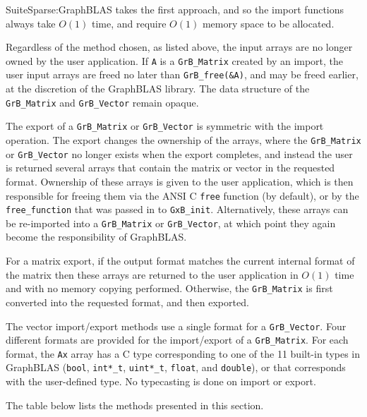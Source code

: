 \documentclass[12pt]{article}
\begin{document}
SuiteSparse:GraphBLAS takes the first approach, and so the import functions
always take $O(1)$ time, and require $O(1)$ memory space to be allocated.

Regardless of the method chosen, as listed above, the input arrays are no
longer owned by the user application.  If \verb'A' is a \verb'GrB_Matrix'
created by an import, the user input arrays are freed no later than
\verb'GrB_free(&A)', and may be freed earlier, at the discretion of the
GraphBLAS library.  The data structure of the \verb'GrB_Matrix' and
\verb'GrB_Vector' remain opaque.

The export of a \verb'GrB_Matrix' or \verb'GrB_Vector' is symmetric with the
import operation.  The export changes the ownership of the arrays, where the
\verb'GrB_Matrix' or \verb'GrB_Vector' no longer exists when the export
completes, and instead the user is returned several arrays that contain the
matrix or vector in the requested format.  Ownership of these arrays is given
to the user application, which is then responsible for freeing them via the
ANSI C \verb'free' function (by default), or by the \verb'free_function' that
was passed in to \verb'GxB_init'.  Alternatively, these arrays can be
re-imported into a \verb'GrB_Matrix' or \verb'GrB_Vector', at which point they
again become the responsibility of GraphBLAS.

For a matrix export, if the output format matches the current internal format
of the matrix then these arrays are returned to the user application in $O(1)$
time and with no memory copying performed.  Otherwise, the \verb'GrB_Matrix' is
first converted into the requested format, and then exported.

The vector import/export methods use a single format for a \verb'GrB_Vector'.
Four different formats are provided for the import/export of a
\verb'GrB_Matrix'.  For each format, the \verb'Ax' array has a C type
corresponding to one of the 11 built-in types in GraphBLAS (\verb'bool',
\verb'int*_t', \verb'uint*_t', \verb'float', and \verb'double'), or that
corresponds with the user-defined type.  No typecasting is done on import or
export.

The table below lists the methods presented in this section.
\end{document}
